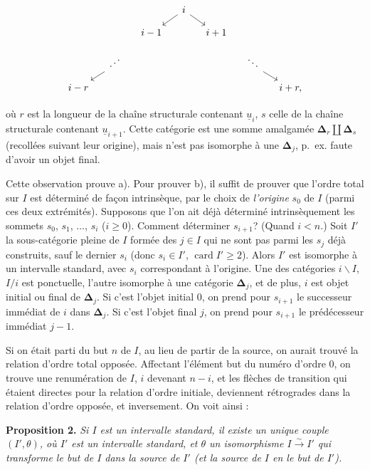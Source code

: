 \documentclass[11pt]{article}
\newcommand{\printedpage}[1]{\marginpar{\footnotesize p.~#1}}
\newcommand{\msp}[1]{\marginpar{\footnotesize [#1]}}
\newcommand{\bD}{\boldsymbol{\Delta}}
\newcommand{\iddots}{\mathinner{\mkern1mu\raise1pt\hbox{.}\mkern2mu\raise4pt\hbox{.}\mkern2mu\raise7pt\hbox{.}\mkern1mu}}
\begin{document}
\printedpage{4}

\[
\begin{tikzcd}[column sep=small, row sep=small]
 & & & i \arrow[dl] \arrow[dr] & & & \\
 & & i-1 & & i+1 & & \\
 & \iddots \arrow[dl] & & & & \ddots \arrow[dr] & \\
 i-r & & & & & & i+r, %
\end{tikzcd}
\]

où $r$ est la longueur de la chaîne structurale contenant $\underline{u}_i$, $s$ celle de la chaîne structurale contenant $\underline{u}_{i+1}$. Cette catégorie est une somme amalgamée $\bD_r \amalg \bD_s$ (recollées suivant leur origine), mais n'est pas isomorphe à une $\bD_j$, p.~ex. faute d'avoir un objet final.

Cette observation prouve a). Pour prouver b), il suffit de prouver que l'ordre total sur $I$ est déterminé de façon intrinsèque, par le choix de \textit{l'origine} $s_0$ de $I$ (parmi ces %
deux extrémités). Supposons que l'on ait déjà déterminé intrinsèquement les sommets $s_0$, $s_1$, $\ldots$, $s_i$ ($i \geq 0$). Comment déterminer $s_{i+1}$? (Quand $i < n$.) Soit $I'$ la sous-catégorie pleine de $I$
\msp{page 7}
formée des $j \in I$ qui ne sont pas parmi les $s_j$ déjà construits, sauf le dernier $s_i$ (donc $s_i \in I'$, $\operatorname{card} I' \geq 2$). Alors $I'$ est isomorphe à un intervalle standard, avec $s_i$ correspondant à l'origine. Une des catégories $i\backslash I$, $I/i$ est ponctuelle, l'autre isomorphe à une catégorie $\bD_j$, et de plus, $i$ est objet initial ou final de $\bD_j$. Si c'est l'objet initial $0$, on prend pour $s_{i+1}$ le successeur immédiat de $i$ dans $\bD_j$. Si c'est l'objet final $j$, on prend pour $s_{i+1}$ le prédécesseur immédiat $j-1$.

Si on était parti du but $n$ de $I$, au lieu de partir de la source, on aurait trouvé la relation d'ordre total opposée. Affectant l'élément but du numéro d'ordre $0$, on trouve une renumération de $I$, $i$ devenant $n-i$, et les flèches de transition qui étaient directes pour la relation d'ordre initiale, deviennent rétrogrades dans la relation d'ordre opposée, et inversement. On voit ainsi :

\textbf{Proposition 2.} \textit{Si $I$ est un intervalle standard, il existe un unique couple $(I',\theta)$, où $I'$ est un intervalle standard, et $\theta$ un isomorphisme $I \xrightarrow{\sim} I'$ qui transforme le but de $I$ dans la source de $I'$ (et la source de $I$ en le but de $I'$).}
\end{document}

